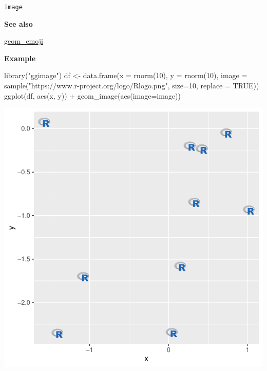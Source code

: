 \documentclass[
  letterpaper,
  DIV=11,
  numbers=noendperiod]{scrreprt}
\newenvironment{Shaded}{\begin{snugshade}}{\end{snugshade}}
\newcommand{\AttributeTok}[1]{\textcolor[rgb]{0.40,0.45,0.13}{#1}}
\newcommand{\ConstantTok}[1]{\textcolor[rgb]{0.56,0.35,0.01}{#1}}
\newcommand{\DecValTok}[1]{\textcolor[rgb]{0.68,0.00,0.00}{#1}}
\newcommand{\FunctionTok}[1]{\textcolor[rgb]{0.28,0.35,0.67}{#1}}
\newcommand{\NormalTok}[1]{\textcolor[rgb]{0.00,0.23,0.31}{#1}}
\newcommand{\OtherTok}[1]{\textcolor[rgb]{0.00,0.23,0.31}{#1}}
\newcommand{\SpecialCharTok}[1]{\textcolor[rgb]{0.37,0.37,0.37}{#1}}
\newcommand{\StringTok}[1]{\textcolor[rgb]{0.13,0.47,0.30}{#1}}
\begin{document}
\texttt{image}

\textbf{See also}

\hyperref[emoji]{geom\_emoji}

\textbf{Example}

\begin{Shaded}
\begin{Highlighting}[]
\FunctionTok{library}\NormalTok{(}\StringTok{"ggimage"}\NormalTok{)}
\NormalTok{df }\OtherTok{\textless{}{-}} \FunctionTok{data.frame}\NormalTok{(}\AttributeTok{x =} \FunctionTok{rnorm}\NormalTok{(}\DecValTok{10}\NormalTok{),}
                 \AttributeTok{y =} \FunctionTok{rnorm}\NormalTok{(}\DecValTok{10}\NormalTok{),}
                \AttributeTok{image =} \FunctionTok{sample}\NormalTok{(}\StringTok{"https://www.r{-}project.org/logo/Rlogo.png"}\NormalTok{,}
                              \AttributeTok{size=}\DecValTok{10}\NormalTok{, }\AttributeTok{replace =} \ConstantTok{TRUE}\NormalTok{))}
\FunctionTok{ggplot}\NormalTok{(df, }\FunctionTok{aes}\NormalTok{(x, y)) }\SpecialCharTok{+} \FunctionTok{geom\_image}\NormalTok{(}\FunctionTok{aes}\NormalTok{(}\AttributeTok{image=}\NormalTok{image))}
\end{Highlighting}
\end{Shaded}

\includegraphics{i_files/figure-pdf/unnamed-chunk-2-1.pdf}
\end{document}
